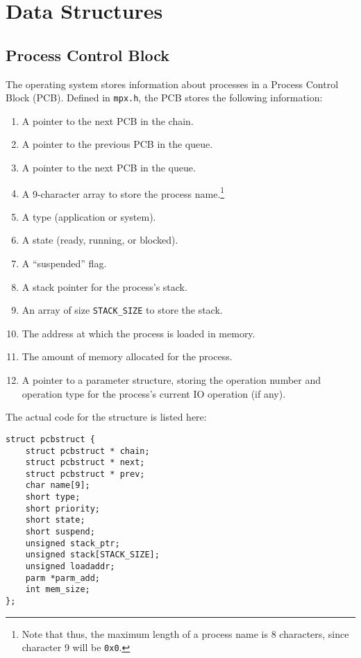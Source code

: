 \chapter{Data Structures}
\label{data_structures}

\section{Process Control Block}
\label{process_control_block}

The operating system stores information about processes in a Process Control Block (PCB). Defined in {\tt mpx.h}, the PCB stores the following information:
\begin{enumerate}
    \item A pointer to the next PCB in the chain.
    \item A pointer to the previous PCB in the queue.
    \item A pointer to the next PCB in the queue.
    \item A 9-character array to store the process name.\footnote{Note that thus, the maximum length of a process name is 8 characters, since character 9 will be {\tt 0x0}.}
    \item A type (application or system).
    \item A state (ready, running, or blocked).
    \item A ``suspended'' flag.
    \item A stack pointer for the process's stack.
    \item An array of size {\tt STACK\_SIZE} to store the stack.
    \item The address at which the process is loaded in memory.
    \item The amount of memory allocated for the process.
    \item A pointer to a parameter structure, storing the operation number and operation type for the process's current IO operation (if any).
\end{enumerate}

The actual code for the structure is listed here:

\begin{lstlisting}
struct pcbstruct {
    struct pcbstruct * chain;
    struct pcbstruct * next;
    struct pcbstruct * prev;
    char name[9];
    short type;
    short priority;
    short state;
    short suspend;
    unsigned stack_ptr;
    unsigned stack[STACK_SIZE];
    unsigned loadaddr;
    parm *parm_add;
    int mem_size;
};
\end{lstlisting}

